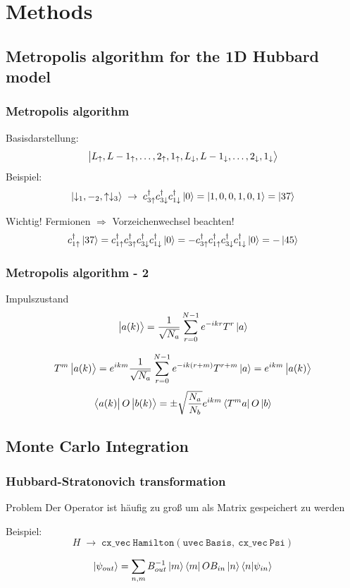 \documentclass{beamer}
\begin{document}
\section{Methods}

\subsection{Metropolis algorithm for the 1D Hubbard model}
\begin{frame}
\frametitle{Metropolis algorithm}
Basisdarstellung:
\[ \ket{L_\uparrow,L-1_\uparrow,\dots,2_\uparrow,1_\uparrow,L_\downarrow,L-1_\downarrow,\dots,2_\downarrow,1_\downarrow} \]
Beispiel:
\[ \ket{\downarrow_1,-_2,\uparrow\downarrow_3}\;\rightarrow \; c^\dagger_{3\uparrow}c^\dagger_{3\downarrow}c^\dagger_{1\downarrow}\ket{0} = \ket{1, 0, 0, 1, 0 , 1} = \ket{37} \]\pause
\begin{block}{Wichtig!}
Fermionen $ \Rightarrow $ Vorzeichenwechsel beachten!
\[ c^\dagger_{1\uparrow}\ket{37} =  c^\dagger_{1\uparrow}c^\dagger_{3\uparrow}c^\dagger_{3\downarrow}c^\dagger_{1\downarrow}\ket{0}=-c^\dagger_{3\uparrow}c^\dagger_{1\uparrow}c^\dagger_{3\downarrow}c^\dagger_{1\downarrow}\ket{0}=-\ket{45}\]
\end{block}
\end{frame}

\begin{frame}
\frametitle{Metropolis algorithm - 2}
\begin{block}{Impulszustand}
\[ \ket{a(k)} = \frac{1}{\sqrt{N_a}}\sum_{r=0}^{N-1}e^{-ikr}T^r\ket{a} \]
\end{block}
\[ T^m\ket{a(k)} = e^{ikm}\frac{1}{\sqrt{N_a}}\sum_{r=0}^{N-1}e^{-ik(r+m)}T^{r+m}\ket{a}=e^{ikm}\ket{a(k)} \]
\[ \bra{a(k)}O\ket{b(k)} = \pm\sqrt{\frac{N_a}{N_b}}e^{ikm} \bra{T^ma}O\ket{b} \]
\end{frame}
\subsection{Monte Carlo Integration}
\begin{frame}
\frametitle{Hubbard-Stratonovich transformation}
\begin{block}{Problem}
Der Operator ist häufig zu groß um als Matrix gespeichert zu werden
\end{block}
Beispiel:
\[ H\;\rightarrow\; \mathtt{cx\_vec\: Hamilton(uvec\: Basis,\:cx\_vec\: Psi)}\]


\[ \ket{\psi_{out}} = \sum_{n,m}B^{-1}_{out}\ket{m}\bra{m}OB_{in}\ket{n}\bra{n}\ket{\psi_{in}} \]
\end{frame}
\end{document}

